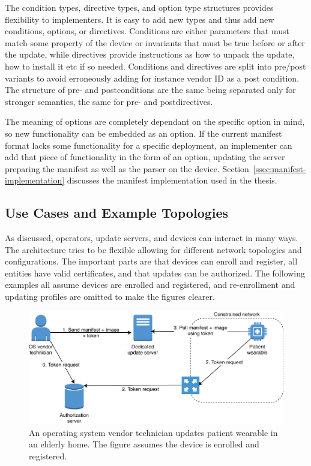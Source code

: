 \documentclass[0-thesis.tex]{subfiles}
\begin{document}
The condition types, directive types, and option type structures provides flexibility to
implementers. It is easy to add new types and thus add new conditions, options, or
directives. Conditions are either parameters that must match some property of the device
or invariants that must be true before or after the update, while directives provide
instructions as how to unpack the update, how to install it etc if so needed. Conditions
and directives are split into pre/post variants to avoid erroneously adding for instance
vendor ID as a post condition. The structure of pre- and postconditions are the same being
separated only for stronger semantics, the same for pre- and postdirectives.

The meaning of options are completely dependant on the specific option in mind, so new
functionality can be embedded as an option. If the current manifest format lacks some
functionality for a specific deployment, an implementer can add that piece of
functionality in the form of an option, updating the server preparing the manifest as well
as the parser on the device. Section~\ref{ssec:manifest-implementation} discusses the
manifest implementation used in the thesis.

\subsection{Use Cases and Example Topologies}
\label{ssec:use-cases-examples-topologies}
As discussed, operators, update servers, and devices can interact in many ways. The
architecture tries to be flexible allowing for different network topologies and
configurations. The important parts are that devices can enroll and register, all entities
have valid certificates, and that updates can be authorized. The following examples all
assume devices are enrolled and registered, and re-enrollment and updating profiles are
omitted to make the figures clearer.

\begin{figure}[t]
    \caption{An operating system vendor technician updates patient wearable in an elderly home. The figure assumes the device is enrolled and registered.}
    \label{fig:elderly-home}
    \includegraphics{images/use-case-elderly-home.pdf}
\end{figure}
\end{document}
